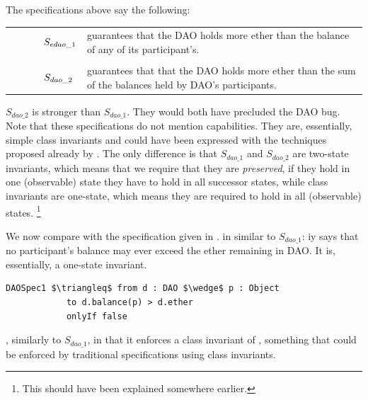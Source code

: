 The specifications above say the following:
\\
\begin{tabular}{ll}
\begin{minipage}{.10\textwidth}
$\strut \ \ \ \ \ \ \ \ \ \   S_{edao\_1}$
\end{minipage}
&
\begin{minipage}{.85\textwidth}
guarantees that the DAO holds more ether than the balance  of any of its  participant's.
\end{minipage}
\\
\\
\begin{minipage}{.10\textwidth}
$\strut \ \ \ \ \ \ \ \ \ \   S_{dao\_2}$ 
\end{minipage}
&
\begin{minipage}{.85\textwidth}
guarantees that that the DAO holds more ether than the sum  of the balances held by DAO's participants.
\end{minipage}
\end{tabular}

$S_{dao\_2}$  is stronger than $S_{dao\_1}$. They would both have precluded the DAO bug. Note that these specifications  do not mention capabilities. 
They are, essentially, simple class invariants and could have been expressed with the techniques proposed already by \cite{MeyerDBC92}.
The only difference is that $S_{dao\_1}$ and $S_{dao\_2}$ are two-state invariants, which means that we require that they are \emph{preserved},
\ie if they hold in one (observable) state they have to hold in all successor states,
while class invariants are one-state, which means they are required to hold in all (observable) states.
\footnote{This should have been explained somewhere earlier.}

\vspace{0.5cm}
We now compare with the specification given in \cite{OOPSLA22}.
 in similar to  $S_{dao\_1}$: iy
says that no participant's balance may ever exceed the ether remaining 
in DAO. It is, essentially, a one-state invariant.


\begin{lstlisting}[language = Chainmail, mathescape=true, frame=lines]
DAOSpec1 $\triangleq$ from d : DAO $\wedge$ p : Object
            to d.balance(p) > d.ether
            onlyIf false
\end{lstlisting}
, similarly to $S_{dao\_1}$,   in that it enforces a class invariant of , something that could be enforced
by traditional specifications using class invariants.


